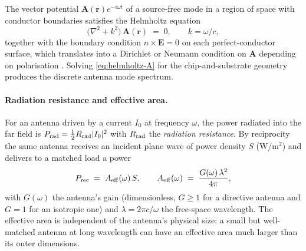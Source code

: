 \begin{statement}
\label{stmt:antenna-modes}
The vector potential $\bm A(\bm r)e^{-i\omega t}$ of a source-free
mode in a region of space with conductor boundaries satisfies the
Helmholtz equation
\begin{equation}
\label{eq:helmholtz-A}
\bigl(\nabla^2 + k^2\bigr)\,\bm A(\bm r) \;=\; 0,
\qquad k=\omega/c,
\end{equation}
together with the boundary condition $\hat n\times\bm E = 0$ on
each perfect-conductor surface, which translates into a Dirichlet
or Neumann condition on $\bm A$ depending on polarisation
\cite{pozar2011,balanis2016}. Solving \cref{eq:helmholtz-A} for the
chip-and-substrate geometry produces the discrete antenna mode
spectrum.
\end{statement}

\paragraph{Radiation resistance and effective area.}
For an antenna driven by a current $I_0$ at frequency $\omega$, the
power radiated into the far field is $P_{\rm rad}=\tfrac12 R_{\rm rad} |I_0|^2$
with $R_{\rm rad}$ the \emph{radiation resistance}. By reciprocity
the same antenna receives an incident plane wave of power
density $S$ (W/m$^2$) and delivers to a matched load a power
\begin{equation}
\label{eq:effective-area}
P_{\rm rec} \;=\; A_{\rm eff}(\omega)\,S,
\qquad
A_{\rm eff}(\omega) \;=\; \frac{G(\omega)\,\lambda^2}{4\pi},
\end{equation}
with $G(\omega)$ the antenna's gain (dimensionless,
$G\geq 1$ for a directive antenna and $G=1$ for an isotropic one)
and $\lambda=2\pi c/\omega$ the free-space wavelength. The
effective area is independent of the antenna's physical size: a
small but well-matched antenna at long wavelength can have an
effective area much larger than its outer dimensions.

